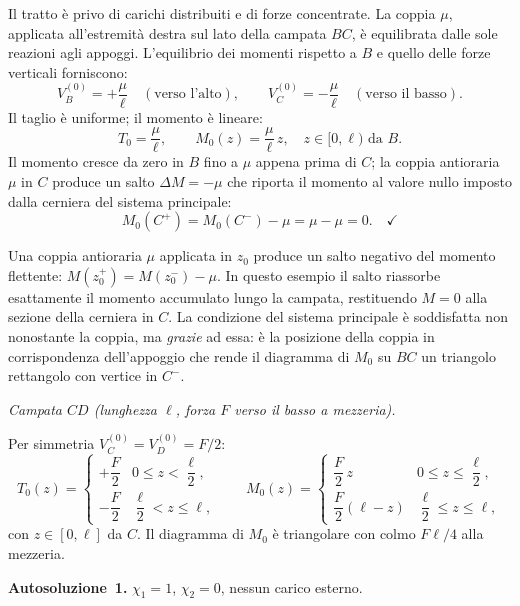 Il tratto è privo di carichi distribuiti e di forze
concentrate. La coppia $\mu$, applicata all'estremità
destra sul lato della campata $BC$, è equilibrata
dalle sole reazioni agli appoggi. L'equilibrio dei
momenti rispetto a $B$ e quello delle forze verticali
forniscono:
\[
V_B^{(0)} = +\frac{\mu}{\ell}
\quad (\text{verso l'alto}), \qquad
V_C^{(0)} = -\frac{\mu}{\ell}
\quad (\text{verso il basso}).
\]
Il taglio è uniforme; il momento è lineare:
\[
T_0 = \frac{\mu}{\ell}, \qquad
M_0(z) = \frac{\mu}{\ell}\,z, \quad z \in [0,\ell) \text{ da } B.
\]
Il momento cresce da zero in $B$ fino a $\mu$ appena
prima di $C$; la coppia antioraria $\mu$ in $C$ produce
un salto $\Delta M = -\mu$ che riporta il momento al
valore nullo imposto dalla cerniera del sistema principale:
\[
M_0(C^+) = M_0(C^-) - \mu = \mu - \mu = 0.
\quad\checkmark
\]

\begin{oss}
Una coppia antioraria $\mu$ applicata in $z_0$ produce
un salto negativo del momento flettente:
$M(z_0^+) = M(z_0^-) - \mu$.
In questo esempio il salto riassorbe esattamente
il momento accumulato lungo la campata, restituendo
$M = 0$ alla sezione della cerniera in $C$.
La condizione del sistema principale è soddisfatta
non nonostante la coppia, ma \emph{grazie} ad essa:
è la posizione della coppia in corrispondenza
dell'appoggio che rende il diagramma di $M_0$
su $BC$ un triangolo rettangolo con vertice in $C^-$.
\end{oss}

\medskip
\noindent\textit{Campata $CD$
(lunghezza $\ell$, forza $F$ verso il basso a mezzeria).}

\noindent Per simmetria $V_C^{(0)} = V_D^{(0)} = F/2$:
\[
T_0(z) = \begin{cases}
+\dfrac{F}{2} & 0 \le z < \dfrac{\ell}{2}, \\[8pt]
-\dfrac{F}{2} & \dfrac{\ell}{2} < z \le \ell,
\end{cases}
\qquad
M_0(z) = \begin{cases}
\dfrac{F}{2}\,z & 0 \le z \le \dfrac{\ell}{2}, \\[8pt]
\dfrac{F}{2}(\ell - z) & \dfrac{\ell}{2} \le z \le \ell,
\end{cases}
\]
con $z \in [0,\ell]$ da $C$. Il diagramma di $M_0$ è
triangolare con colmo $F\ell/4$ alla mezzeria.

\medskip
\noindent\textbf{Autosoluzione~1.}
$\chi_1 = 1$, $\chi_2 = 0$, nessun carico esterno.

